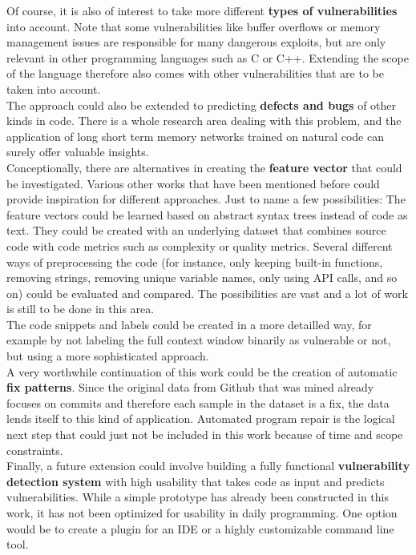 \documentclass[
a4paper,
pagesize,
pdftex,
12pt,
twoside, %
BCOR=5mm, %
ngerman,
fleqn,
final,
]{scrartcl}
\begin{document}
	Of course, it is also of interest to take more different \textbf{types of vulnerabilities} into account. Note that some vulnerabilities like buffer overflows or memory management issues are responsible for many dangerous exploits, but are only relevant in other programming languages such as C or C++. Extending the scope of the language therefore also comes with other vulnerabilities that are to be taken into account.\\
	The approach could also be extended to predicting \textbf{defects and bugs} of other kinds in code. There is a whole research area dealing with this problem, and the application of long short term memory networks trained on natural code can surely offer valuable insights.\\
	Conceptionally, there are alternatives in creating the \textbf{feature vector} that could be investigated. Various other works that have been mentioned before could provide inspiration for different approaches. Just to name a few possibilities: The feature vectors could be learned based on abstract syntax trees instead of code as text. They could be created with an underlying dataset that combines source code with code metrics such as complexity or quality metrics. Several different ways of preprocessing the code (for instance, only keeping built-in functions, removing strings, removing unique variable names, only using API calls, and so on) could be evaluated and compared. The possibilities are vast and a lot of work is still to be done in this area.\\
	The code snippets and labels could be created in a more detailled way, for example by not labeling the full context window binarily as vulnerable or not, but using a more sophisticated approach.\\
	A very worthwhile continuation of this work could be the creation of automatic \textbf{fix patterns}. Since the original data from Github that was mined already focuses on commits and therefore each sample in the dataset is a fix, the data lends itself to this kind of application. Automated program repair is the logical next step that could just not be included in this work because of time and scope constraints.\\
	Finally, a future extension could involve building a fully functional \textbf{vulnerability detection system} with high usability that takes code as input and predicts vulnerabilities. While a simple prototype has already been constructed in this work, it has not been optimized for usability in daily programming. One option would be to create a plugin for an IDE or a highly customizable command line tool.
	
\end{document}
